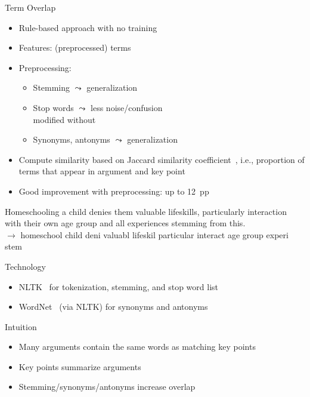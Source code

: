\documentclass[english,handout]{mlutalk}
\begin{document}
\begin{frame}[allowframebreaks]{Term Overlap}
  
  \begin{itemize}
    \item Rule-based approach with no training
    \item Features: (preprocessed) terms
    \item Preprocessing:
    \begin{itemize}
      \item Stemming \(\leadsto\) generalization
      \item Stop words \(\leadsto\) less noise/confusion \\ modified without 
      \item Synonyms, antonyms \(\leadsto\) generalization
    \end{itemize}
    \item Compute similarity based on Jaccard similarity coefficient~\cite{Jaccard1902}, i.e., proportion of terms that appear in argument and key point
    \item Good improvement with preprocessing: up to 12~pp 
  \end{itemize}
  
  \begin{example}[Preprocessing]
    \smaller
    Homeschooling a child denies them valuable lifeskills, particularly interaction with their own age group and all experiences stemming from this. \\
    \(\to\) homeschool child deni valuabl lifeskil particular interact age group experi stem
  \end{example}

  \framebreak
  
  \begin{block}{Technology}
      \begin{itemize}
        \item NLTK~\cite{Bird2006} for tokenization, stemming,  and stop word list
        \item WordNet~\cite{Miller1995} (via NLTK) for synonyms and antonyms
      \end{itemize}
  \end{block}

  \begin{block}{Intuition}
    \begin{itemize}
      \item Many arguments contain the same words as matching key points
      \item Key points summarize arguments
      \item Stemming/synonyms/antonyms increase overlap
    \end{itemize}


\end{block}
\end{frame}
\end{document}

